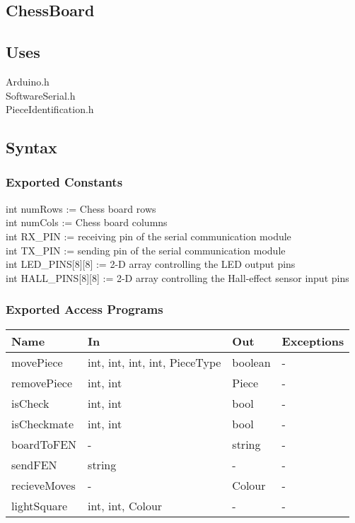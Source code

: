 \documentclass[12pt, titlepage]{article}
\begin{document}
\subsection{ChessBoard}


\subsection{Uses}
Arduino.h\\
SoftwareSerial.h\\
PieceIdentification.h\\

\subsection{Syntax}

\subsubsection{Exported Constants}{
int numRows := Chess board rows \\
int numCols := Chess board columns \\
int RX\_PIN := receiving pin of the serial communication module \\
int TX\_PIN := sending pin of the serial communication module \\
int LED\_PINS[8][8] := 2-D array controlling the LED output pins \\
int HALL\_PINS[8][8] := 2-D array controlling the Hall-effect sensor input pins \\
}

\subsubsection{Exported Access Programs}

\begin{center}
\begin{tabular}{p{2cm} p{4cm} p{4cm} p{2cm}}
\hline
\textbf{Name} & \textbf{In} & \textbf{Out} & \textbf{Exceptions} \\
\hline
movePiece & {int, int, int, int, PieceType} & boolean & - \\
\midrule
removePiece & {int, int} & Piece & - \\
\midrule
isCheck & {int, int} & bool & - \\
\midrule
isCheckmate & {int, int} & bool & - \\
\midrule
boardToFEN & - & string & - \\
\midrule
sendFEN & string & - & - \\
\midrule
recieveMoves & - & Colour & - \\
\midrule
lightSquare & {int, int, Colour} & - & - \\
\hline
\end{tabular}
\end{center}
\end{document}
